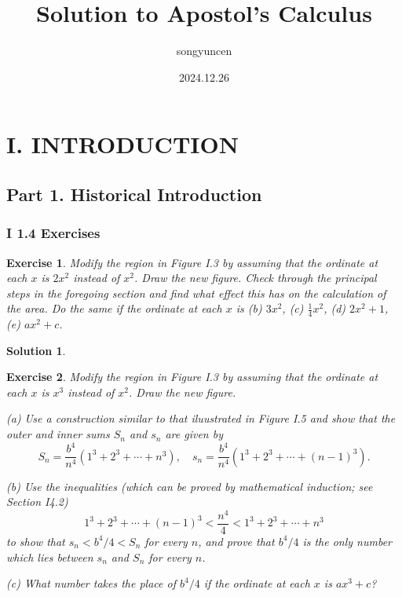 \documentclass[11pt,a4paper]{book}
\title{Solution to Apostol's Calculus}
\author{songyuncen}
\date{2024.12.26}
\newtheorem{exercise}{Exercise}
\newtheorem{solution}{Solution}
\begin{document}
\maketitle
\chapter*{I. INTRODUCTION}
\section*{Part 1. Historical Introduction}
\subsection*{I 1.4 Exercises}

\begin{exercise}
  Modify the region in Figure I.3 by assuming that the ordinate at each $x$  is $2x^2$ instead of $x^2$.
  Draw the new figure. Check through the principal steps in the foregoing section and 
  find what effect this has on the calculation of the area. Do the same if the ordinate
  at each $x$ is (b) $3x^2$, (c) $\frac{1}{4}x^2$, (d) $2x^2 + 1$, (e) $ax^2 + c$.
\end{exercise}

\begin{solution}
\end{solution}
\vrule


\begin{exercise}\label{ex:1}
  Modify the region in Figure I.3 by assuming that the ordinate at each $x$ is $x^3$ instead of $x^2$.
  Draw the new figure.

  (a) Use a construction similar to that iluustrated in Figure I.5 and show that the outer and inner
  sums $S_n$ and $s_n$ are given by
  \[
  S_n = \frac{b^4}{n^4} \left( 1^3 + 2^3 + \cdots + n^3 \right), \quad s_n = \frac{b^4}{n^4} \left( 1^3 + 2^3 + \cdots + (n-1)^3 \right).
  \]

  (b) Use the inequalities (which can be proved by mathematical induction; see Section I4.2)
  \[
  \tag{I.12} 1^3 + 2^3 + \cdots + (n - 1)^3 < \frac{n^4}{4} < 1^3 + 2^3 + \cdots + n^3
  \]
  to show that $s_n < b^4 /4 < S_n$ for every $n$, and prove that $b^4/4$ is the only number which lies between $s_n$ and $S_n$ for every $n$.

  (c) What number takes the place of $b^4/4$ if the ordinate at each $x$ is $ax^3+c$?
\end{exercise}
\end{document}
